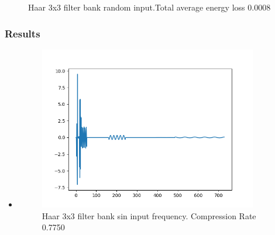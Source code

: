 \documentclass{beamer}
\begin{document}
\begin{frame}
\begin{itemize}
\begin{figure}[ht!]
\begin{minipage}{0.45\textwidth}
                      \caption{Haar 3x3 filter bank random input.Total average energy loss 0.0008}
                  \end{minipage}
              \end{figure}
    \end{itemize}
\end{frame}
\begin{frame}
    \frametitle{Results}
    \begin{itemize}
        \item
              \begin{figure}[ht!]
                  \centering
                  \begin{minipage}{0.45\textwidth}
                      \centering
                      \includegraphics[width=0.9\textwidth]{fig/Haar3Augmented1D_sin_freq.png} %
                      \caption{Haar 3x3 filter bank sin input frequency. Compression Rate 0.7750}
                      \label{fig:Haar3_sin}
                  \end{minipage}\hfill
                  \begin{minipage}{0.45\textwidth}
                      \centering

\end{minipage}
\end{figure}
\end{itemize}
\end{frame}
\end{document}
